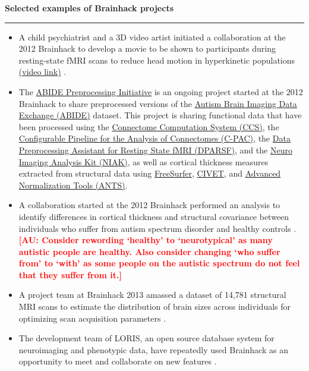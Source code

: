 \begin{table}[!ht]
\caption{{\bf Selected examples of Brainhack projects}\label{tab3}}
\hrule %
    \begin{itemize}
    \item 
        A child psychiatrist and a 3D video artist initiated a collaboration at the 2012 Brainhack to develop a movie to be shown to participants during resting-state fMRI scans to reduce head motion in hyperkinetic populations \href{http://vimeo.com/67962604}{(video link)} \cite{vanderwal2015}.
    \item 
        The \href{http://preprocessed-connectomes-project.github.io/abide}{ABIDE Preprocessing Initiative} is an ongoing project started at the 2012 Brainhack to share preprocessed versions of the \href{http://fcon_1000.projects.nitrc.org/indi/abide}{Autism Brain Imaging Data Exchange (ABIDE)} dataset. This project is sharing functional data that have been processed using the \href{http://lfcd.psych.ac.cn/ccs.html}{Connectome Computation System (CCS)}, the \href{http://fcp-indi.github.io}{Configurable Pipeline for the Analysis of Connectomes (C-PAC)}, the \href{http://rfmri.org/DPARSF}{Data Preprocessing Assistant for Resting State fMRI (DPARSF)}, and the \href{https://www.nitrc.org/projects/niak/}{Neuro Imaging Analysis Kit (NIAK)}, as well as %
 cortical thickness measures extracted from structural data using \href{http://freesurfer.net/}{FreeSurfer}, \href{http://www.bic.mni.mcgill.ca/ServicesSoftware/CIVET}{CIVET}, and \href{http://picsl.upenn.edu/software/ants/}{Advanced Normalization Tools (ANTS)}.
    \item
        A collaboration started at the 2012 Brainhack performed an analysis to identify differences in cortical thickness and structural covariance between individuals who suffer from autism spectrum disorder and healthy controls \cite{Valk2015}.
\textbf{\textcolor{red}{[AU: Consider rewording `healthy' to `neurotypical' as many autistic people are healthy. Also consider changing `who suffer from' to `with' as some people on the autistic spectrum do not feel that they suffer from it.]}}
    \item
        A project team at Brainhack 2013 amassed a dataset of 14,781 structural MRI scans to estimate the distribution of brain sizes across individuals for optimizing scan acquisition parameters \cite{Mennes2014}.
    \item 
        The development team of LORIS, an open source database system for neuroimaging and phenotypic data, have repeatedly used Brainhack as an opportunity to meet and collaborate on new features \cite{Das2012}.

\end{itemize}
\end{table}
